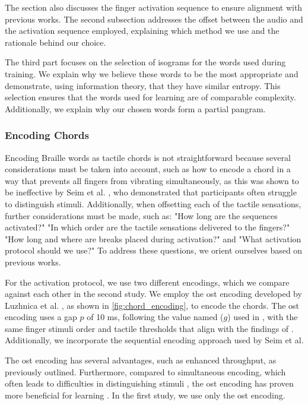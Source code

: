 The section also discusses the finger activation sequence to ensure alignment with previous works. The second subsection addresses the offset between the audio and the activation sequence employed, explaining which method we use and the rationale behind our choice.

The third part focuses on the selection of isograms for the words used during training. We explain why we believe these words to be the most appropriate and demonstrate, using information theory, that they have similar entropy. This selection ensures that the words used for learning are of comparable complexity. Additionally, we explain why our chosen words form a partial pangram.


\subsubsection{Encoding Chords}
Encoding Braille words as tactile chords is not straightforward because several considerations must be taken into account, such as how to encode a chord in a way that prevents all fingers from vibrating simultaneously, as this was shown to be ineffective by Seim et al. \cite{Seim2014}, who demonstrated that participants often struggle to distinguish stimuli. Additionally, when offsetting each of the tactile sensations, further considerations must be made, such as: "How long are the sequences activated?" "In which order are the tactile sensations delivered to the fingers?" "How long and where are breaks placed during activation?" and "What activation protocol should we use?" To address these questions, we orient ourselves based on previous works.

For the activation protocol, we use two different encodings, which we compare against each other in the second study. We employ the \gls{ost} encoding developed by Luzhnica et al. \cite{Luzhnica2018, Luzhnica2018a, Luzhnica2017, Luzhnica2016}, as shown in \autoref{fig:chord_encoding}, to encode the chords. The \gls{ost} encoding uses a gap $p$ of 10 ms, following the value named ($g$) used in \cite{Luzhnica2018}, with the same finger stimuli order and tactile thresholds that align with the findings of \cite{Duncan2007}. Additionally, we incorporate the sequential encoding approach used by Seim et al.

The \gls{ost} encoding has several advantages, such as enhanced throughput, as previously outlined. Furthermore, compared to simultaneous encoding, which often leads to difficulties in distinguishing stimuli \cite{Seim2014}, the \gls{ost} encoding has proven more beneficial for learning \cite{Luzhnica2018}. In the first study, we use only the \gls{ost} encoding.

